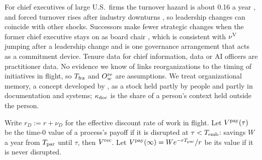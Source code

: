 For chief executives of large U.S.\ firms the turnover hazard is about 0.16 a year \citep{kaplan2012how}, and forced turnover rises after industry downturns \citep{jenter2015ceo}, so leadership changes can coincide with other shocks. Successors make fewer strategic changes when the former chief executive stays on as board chair \citep{quigley2012when}, which is consistent with $\nu^{\rm V}$ jumping after a leadership change and is one governance arrangement that acts as a commitment device. Tenure data for chief information, data or AI officers are practitioner data. No evidence we know of links reorganizations to the timing of initiatives in flight, so $T_{\rm frz}$ and $O^{\rm re}_w$ are assumptions. We treat organizational memory, a concept developed by \citet{walsh1991organizational}, as a stock held partly by people and partly in documentation and systems; $\kappa_{\rm doc}$ is the share of a person's context held outside the person.

Write $r_D:=r+\nu_D$ for the effective discount rate of work in flight. Let $V^{\rm pay}(\tau)$ be the time-0 value of a process's payoff if it is disrupted at $\tau<T_{\rm emb}$: savings $W$ a year from $T_{\rm par}$ until $\tau$, then $V^{\rm rec}$. Let $V^{\rm pay}(\infty)=We^{-rT_{\rm par}}/r$ be its value if it is never disrupted.

